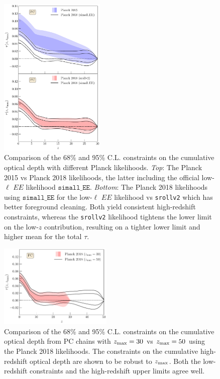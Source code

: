 \documentclass[prd,twocolumn,amsmath,amssymb,floatfix,superscriptaddress,nofootinbib]{revtex4-1}
\newcommand{\zmax}{z_{\rm max}}
\begin{document}
{\begin{figure}[ht]
\includegraphics[width=0.45\textwidth]{paper/plots/pl18_taugtz_pc_zmax30_pl15_vs_pl18_simallEE_vs_pl18_srollv2_do_rescale_tau_false.pdf}
\caption{Comparison of the 68\% and 95\% C.L. constraints on the cumulative optical depth with different Planck likelihoods. \textit{Top}: The Planck 2015 vs Planck 2018 likelihoods, the latter including the official low-$\ell$ $EE$ likelihood $\texttt{simall\_EE}$. \textit{Bottom}: The Planck 2018 likelihoods using $\texttt{simall\_EE}$ for the low-$\ell$ $EE$ likelihood vs \texttt{srollv2} which has better foreground cleaning. Both yield consistent high-redshift constraints, whereas the \texttt{srollv2} likelihood tightens the lower limit on the low-$z$ contribution, resulting on a tighter lower limit and higher mean for the total $\tau$. 
}
\label{fig:plot_taugtz_2015_vs_2018_simallEE_vs_2018_srollv2}
\end{figure}


\begin{figure}[ht]
\includegraphics[width=0.48\textwidth]{paper/plots/pl18_taugtz_pl18_srollv2_pc_zmax30_vs_zmax50_do_rescale_tau_false.pdf}
\caption{Comparison of the 68\% and 95\% C.L. constraints on the cumulative optical depth from PC chains with $\zmax = 30$ vs $\zmax = 50$ using the Planck 2018 likelihoods. The constraints on the cumulative high-redshift optical depth are shown to be robust to $\zmax$. Both the low-redshift constraints and the high-redshift upper limits agree well. 
}
\label{fig:plot_taugtz_zmax30_vs_zmax50}
\end{figure}


}
\end{document}
